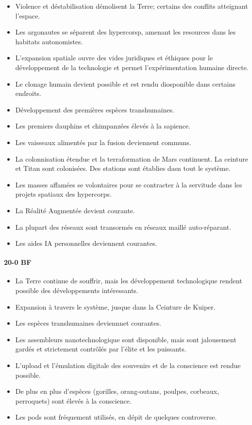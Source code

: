 \begin{itemize} \item Violence et déstabilisation démolisent la Terre; certains des conflits atteignant l'espace. \item Les argonautes se séparent des hypercorsp, amenant les resources dans les habitats autonomistes. \item L'expansion spatiale ouvre des vides juridiques et éthiques pour le développement de la technologie et permet l'expérimentation humaine directe. \item Le clonage humain devient possible et est rendu diosponible dans certains endroits. \item Développement des premières espèces transhumaines. \item Les premiers dauphins et chimpanzées élevés à la sapience. \item Les vaisseaux alimentés par la fusion deviennent communs. \item La colonnisation étendue et la terraformation de Mars continuent. La ceinture et Titan sont colonisées. Des stations sont établies dasn tout le système. \item Les masses affamées se volontaires pour se contracter à la servitude dans les projets spatiaux des hypercorps. \item La Réalité Augmentée devient courante. \item La plupart des réseaux sont transormés en réseaux maillé auto-réparant. \item Les aides IA personnelles deviennent courantes. \end{itemize} 

\paragraph{20-0 BF} 

\begin{itemize} \item La Terre continue de souffrir, mais les développement technologique rendent possible des développements intéressants. \item Expansion à travers le système, jusque dans la Ceinture de Kuiper. \item Les espèces transhumaines deviennnet courantes. \item Les assembleurs nanotechnologique sont disponible, mais sont jalousement gardés et strictement contrôlés par l'élite et les puissants. \item L'upload et l'émulation digitale des souvenirs et de la conscience est rendue possible. \item De plus en plus d'espèces (gorilles, orang-outans, poulpes, corbeaux, perroquets) sont élevés à la conscience. \item Les pods sont fréquement utilisés, en dépit de quelques controverse. \end{itemize} 

